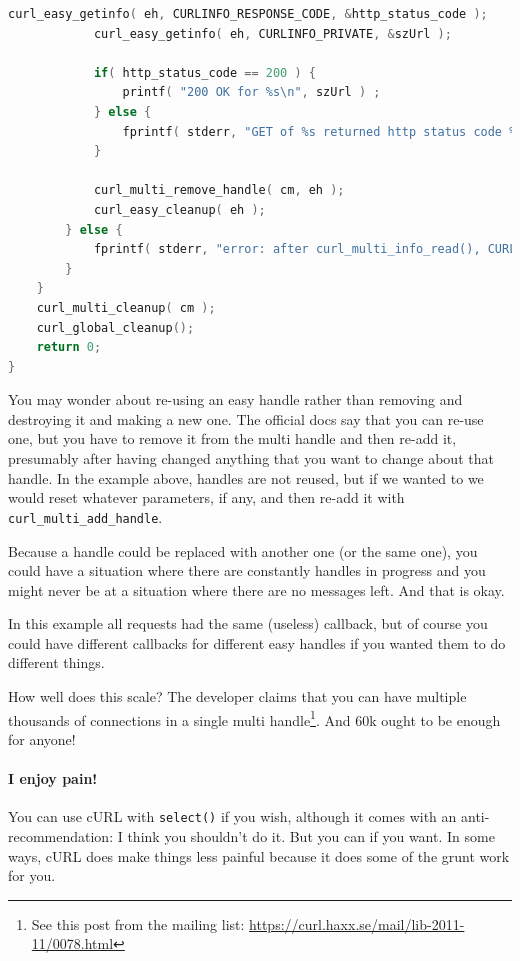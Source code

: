 \documentclass[a4paper]{report}
\begin{document}
\begin{lstlisting}[language=C]
            curl_easy_getinfo( eh, CURLINFO_RESPONSE_CODE, &http_status_code );
            curl_easy_getinfo( eh, CURLINFO_PRIVATE, &szUrl );

            if( http_status_code == 200 ) {
                printf( "200 OK for %s\n", szUrl ) ;
            } else {
                fprintf( stderr, "GET of %s returned http status code %d\n", szUrl, http_status_code );
            }

            curl_multi_remove_handle( cm, eh );
            curl_easy_cleanup( eh );
        } else {
            fprintf( stderr, "error: after curl_multi_info_read(), CURLMsg=%d\n", msg->msg );
        }
    }
    curl_multi_cleanup( cm );
    curl_global_cleanup();
    return 0;
}
\end{lstlisting}

You may wonder about re-using an easy handle rather than removing and destroying it and making a new one. The official docs say that you can re-use one, but you have to remove it from the multi handle and then re-add it, presumably after having changed anything that you want to change about that handle. In the example above, handles are not reused, but if we wanted to we would reset whatever parameters, if any, and then re-add it with \texttt{curl\_multi\_add\_handle}.

Because a handle could be replaced with another one (or the same one), you could have a situation where there are constantly handles in progress and you might never be at a situation where there are no messages left. And that is okay.

In this example all requests had the same (useless) callback, but of course you could have different callbacks for different easy handles if you wanted them to do different things.

How well does this scale? The developer claims that you can have multiple thousands of connections in a single multi handle\footnote{See this post from the mailing list: \url{https://curl.haxx.se/mail/lib-2011-11/0078.html}}. And 60k ought to be enough for anyone!

\paragraph{I enjoy pain!} You can use cURL with \texttt{select()} if you wish, although it comes with an anti-recommendation: I think you shouldn't do it. But you can if you want. In some ways, cURL does make things less painful because it does some of the grunt work for you.
\end{document}
